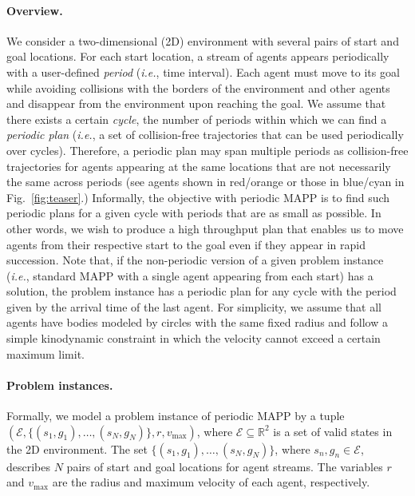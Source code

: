 \documentclass[letterpaper]{article} %
\def\ie{{\it i.e.}}
\begin{document}
\paragraph{Overview.}
We consider a two-dimensional (2D) environment with several pairs of start and goal locations. For each start location, a stream of agents appears periodically with a user-defined \emph{period} (\ie, time interval). Each agent must move to its goal while avoiding collisions with the borders of the environment and other agents and disappear from the environment upon reaching the goal. We assume that there exists a certain \emph{cycle}, the number of periods within which we can find a \emph{periodic plan} (\ie, a set of collision-free trajectories that can be used periodically over cycles). Therefore, a periodic plan may span multiple periods as collision-free trajectories for agents appearing at the same locations that are not necessarily the same across periods (see agents shown in red/orange or those in blue/cyan in Fig.~\ref{fig:teaser}.) Informally, the objective with periodic MAPP is to find such periodic plans for a given cycle with periods that are as small as possible. In other words, we wish to produce a high throughput plan that enables us to move agents from their respective start to the goal even if they appear in rapid succession. Note that, if the non-periodic version of a given problem instance (\ie, standard MAPP with a single agent appearing from each start) has a solution, the problem instance has a periodic plan for any cycle with the period given by the arrival time of the last agent. For simplicity, we assume that all agents have bodies modeled by circles with the same fixed radius and follow a simple kinodynamic constraint in which the velocity cannot exceed a certain maximum limit. 

\paragraph{Problem instances.}
Formally, we model a problem instance of periodic MAPP by a tuple $(\mathcal{E}, \{(s_1,g_1),\dots,(s_N, g_N)\}, r, v_\mathrm{max})$, where $\mathcal{E}\subseteq \mathbb{R}^2$ is a set of valid states in the 2D environment. The set $\{(s_1,g_1),\dots,(s_N, g_N)\}$, where $s_n, g_n\in\mathcal{E}$, describes $N$ pairs of start and goal locations for agent streams. The variables $r$ and $v_\mathrm{max}$ are the radius and maximum velocity of each agent, respectively. 
\end{document}
